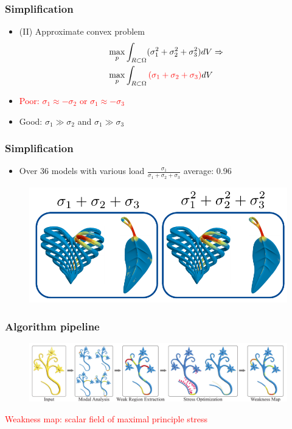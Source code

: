 \documentclass[serif,mathserif, 12pt]{beamer}
\newcommand{\TODO}[1]{\textcolor{red}{#1}}
\newcommand{\TODOG}[1]{\textcolor{green!50!black}{#1}}
\begin{document}
\begin{frame}
  \frametitle{Simplification}
  \begin{itemize}
  \item (II) Approximate convex problem
    \begin{equation*}
      \begin{split}
        &\max_{p} \int_{R\subset \Omega} (\sigma_1^2+\sigma_2^2+\sigma_3^2)dV \Rightarrow \\
        &\max_{p} \int_{R\subset \Omega} \TODO{(\sigma_1+\sigma_2+\sigma_3)} dV \\
      \end{split}
    \end{equation*}
    \pause
  \item \TODO{Poor: $\sigma_1 \approx -\sigma_2$ or $\sigma_1 \approx -\sigma_3$}
  \item \TODOG{Good: $\sigma_1 \gg \sigma_2$ and $\sigma_1 \gg \sigma_3$}
  \end{itemize}  
\end{frame}

\begin{frame}
  \frametitle{Simplification}
  \begin{itemize}
  \item Over 36 models with various load $\frac{\sigma_1}{\sigma_1+\sigma_2+\sigma_3}$ average: 0.96
  \end{itemize}
  \begin{figure}
    \centering
    \includegraphics[width=\textwidth]{img/validation_trace}
  \end{figure}
\end{frame}

\begin{frame}
  \frametitle{Algorithm pipeline}
  \begin{figure}
    \centering
    \includegraphics[width=\textwidth]{img/pipeline}
  \end{figure}
  \TODO{Weakness map: scalar field of maximal principle stress}
\end{frame}
\end{document}
